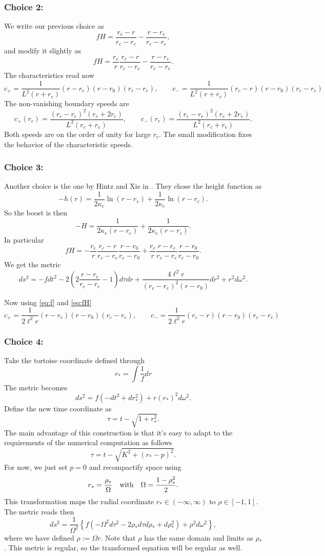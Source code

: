 \documentclass[a4paper]{article}
\begin{document}
\subsubsection{\bf Choice 2:}

We write our previous choice as
\[ f H = \frac{r_c-r}{r_c-r_e} - \frac{r-r_e}{r_c-r_e},\]
and modify it slightly as
\[ f H = \frac{r_e}{r} \frac{r_c-r}{r_c-r_e} - \frac{r-r_e}{r_c-r_e}.\]
The characteristics read now
\[ c_{+} = \frac{1}{L^2 (r+r_e)} (r-r_e)(r-r_0)(r_c-r_e), \qquad  c_{-} = \frac{1}{L^2 (r+r_c)} (r_c-r)(r-r_0)(r_c-r_e) \]
The non-vanishing boundary speeds are
\[ c_+(r_c) = \frac{(r_c-r_e)^2 (r_e+2 r_c)}{L^2 (r_c+r_e)}, \qquad c_-(r_e) =  \frac{(r_c-r_e)^2 (r_c+2 r_e)}{L^2 (r_c+r_e)}. \]
Both speeds are on the order of unity for large $r_c$. The small modification fixes the behavior of the characteristic speeds.

\subsubsection{\bf Choice 3:}
Another choice is the one by Hintz and Xie in \cite{hintz:2021}. They chose the height function as
\[ -h(r) = \frac{1}{2\kappa_e} \ln(r-r_e) + \frac{1}{2\kappa_c} \ln(r-r_c). \]
So the boost is then
\[ -H = \frac{1}{2\kappa_e (r-r_e)}+ \frac{1}{2\kappa_c (r-r_c)}.\]
In particular
\[ fH = - \frac{r_e}{r} \frac{r_c-r}{r_c-r_e} \frac{r-r_0}{r_e-r_0} +  \frac{r_c}{r} \frac{r-r_e}{r_c-r_e} \frac{r-r_0}{r_c-r_0}. \]
We get the metric
\[ ds^2 = - f dt^2 - 2 \left(2 \frac{r-r_e}{r_c-r_e} - 1\right) d\tau dr + \frac{4 \ell^2 r}{(r_c-r_e)^2 (r-r_0)} dr^2 + r^2 d\omega^2. \]

Now using \eqref{eq:f} and \eqref{eq:fH}
\[ c_{+} = \frac{1}{2\ell^2 r} (r-r_e)(r-r_0)(r_c-r_e), \qquad  c_{-} = \frac{1}{2\ell^2 r} (r_c-r)(r-r_0)(r_c-r_e) \]

\subsubsection{\bf Choice 4:}

Take the tortoise coordinate defined through
\[ r_\ast = \int\frac{1}{f}dr \]
The metric becomes 
\[ ds^2 = f \left( -dt^2 + dr_\ast^2\right) + r(r_\ast)^2 d\omega^2. \]
Define the new time coordinate as 
\[ \tau = t - \sqrt{1+r_\ast^2}. \]
The main advantage of this construction is that it's easy to adapt to the requirements of the numerical computation as follows
\[ \tau = t - \sqrt{K^2+(r_\ast-p)^2}. \]
For now, we just set $p=0$ and recompactify space using
\[ r_\ast  = \frac{\rho_\ast}{\Omega} \quad \rm{with} \quad \Omega = \frac{1-\rho_\ast^2}{2}.\]
This transformation maps the radial coordinate $r_\ast\in(-\infty,\infty)$ to $\rho\in[-1,1]$. The metric reads then
\[  ds^2 =  \frac{1}{\Omega^2} \left\{ f\left(-\Omega^2 d\tau^2 - 2 \rho_\ast d\tau d\rho_\ast +  d\rho_\ast^2\right) + \rho^2 d\omega^2 \right\}, \] 
where we have defined $\rho :=  \Omega r$. Note that $\rho$ has the same domain and limits as $\rho_\ast$. This metric is regular, so the transformed equation will be regular as well.
\end{document}
